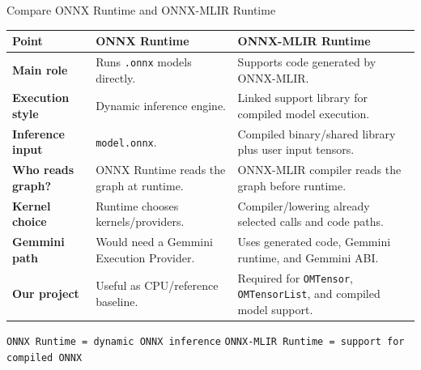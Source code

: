 \documentclass[aspectratio=169,10pt]{beamer}
\newcommand{\code}[1]{\texttt{\footnotesize #1}}
\newcommand{\edgeword}[1]{\textcolor{red!75!black}{\textbf{#1}}}
\begin{document}
\begin{frame}{Compare ONNX Runtime and ONNX-MLIR Runtime}
  \scriptsize
  \begin{tabularx}{\textwidth}{@{}lXX@{}}
    \toprule
    Point & ONNX Runtime & ONNX-MLIR Runtime \\
    \midrule
    \edgeword{Main role} & Runs \code{.onnx} models directly. & Supports code generated by ONNX-MLIR. \\
    \edgeword{Execution style} & Dynamic inference engine. & Linked support library for compiled model execution. \\
    \edgeword{Inference input} & \code{model.onnx}. & Compiled binary/shared library plus user input tensors. \\
    \edgeword{Who reads graph?} & ONNX Runtime reads the graph at runtime. & ONNX-MLIR compiler reads the graph before runtime. \\
    \edgeword{Kernel choice} & Runtime chooses kernels/providers. & Compiler/lowering already selected calls and code paths. \\
    \edgeword{Gemmini path} & Would need a Gemmini Execution Provider. & Uses generated code, Gemmini runtime, and Gemmini ABI. \\
    \edgeword{Our project} & Useful as CPU/reference baseline. & Required for \code{OMTensor}, \code{OMTensorList}, and compiled model support. \\
    \bottomrule
  \end{tabularx}

  \vspace{0.35em}
  \begin{center}
    \code{ONNX Runtime = dynamic ONNX inference} \qquad
    \code{ONNX-MLIR Runtime = support for compiled ONNX}
  \end{center}
\end{frame}
\end{document}
